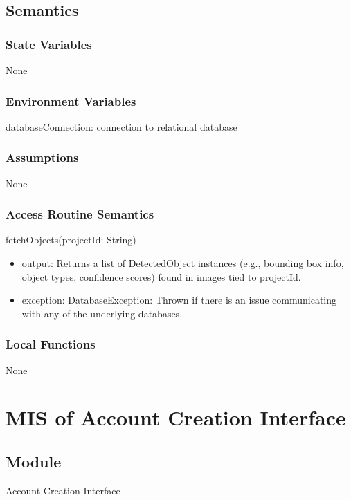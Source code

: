 \documentclass[12pt, titlepage]{article}
\begin{document}
\subsection{Semantics}
\subsubsection{State Variables}
    None

\subsubsection{Environment Variables}
    databaseConnection: connection to relational database

\subsubsection{Assumptions}
    None

\subsubsection{Access Routine Semantics}
    \noindent fetchObjects(projectId: String)
    \begin{itemize}
        \item output: Returns a list of DetectedObject instances (e.g., bounding box info, object types, confidence scores) found in images tied to projectId.
        \item exception: DatabaseException: Thrown if there is an issue communicating with any of the underlying databases.
    \end{itemize}

\subsubsection{Local Functions}
    None







  
\section{MIS of Account Creation Interface} \label{aci}

\subsection{Module}

Account Creation Interface
\end{document}
